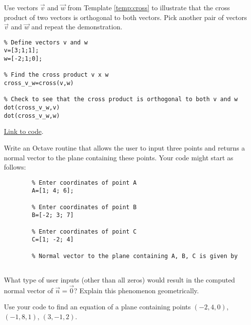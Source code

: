 \documentclass{ximera}
\begin{document}
\begin{problem}\label{prob_oct_vec_1}
    Use vectors $\vec{v}$ and $\vec{w}$ from Template \ref{temp:cross} to illustrate that the cross product of two vectors is orthogonal to both vectors.  Pick another pair of vectors $\vec{v}$ and $\vec{w}$ and repeat the demonstration.
    \begin{hint}
        \begin{verbatim}
% Define vectors v and w
v=[3;1;1];
w=[-2;1;0];

% Find the cross product v x w
cross_v_w=cross(v,w)

% Check to see that the cross product is orthogonal to both v and w
dot(cross_v_w,v)
dot(cross_v_w,w)
\end{verbatim}

\href{https://sagecell.sagemath.org/?z=eJxtjsEKwjAQRO-B_sNeCg1UsHoMOSn-RJES09UEpSvJmvj5phUUxNvMMG9na9jj2U8ICS1TiJDATCPkSiTdb1WnuqOqRNb9alPMejaVqOHgS4kdgg0UI9wDjQ_LBX7O6BIOach6UU1qs3xzO4f2CkwQEQtv-M8RH4ECO7rQZG5z90Tsvn-NxM1noE3yN8nyBT-BRHk=&lang=octave&interacts=eJyLjgUAARUAuQ==}{Link to code}.
    \end{hint}
\end{problem}

\begin{problem}\label{prob_oct_vec_4}
    Write an Octave routine that allows the user to input three points and returns a normal vector to the plane containing these points.  Your code might start as follows:

    \begin{verbatim}
        % Enter coordinates of point A
        A=[1; 4; 6];
        
        % Enter coordinates of point B
        B=[-2; 3; 7]
        
        % Enter coordinates of point C
        C=[1; -2; 4]
        
        % Normal vector to the plane containing A, B, C is given by
        
    \end{verbatim}

    What type of user inputs (other than all zeros) would result in the computed normal vector of $\vec{n}=\vec{0}$?  Explain this phenomenon geometrically.

    Use your code to find an equation of a plane containing points $(-2, 4, 0)$, $(-1, 8, 1)$, $(3, -1, 2)$.
\end{problem}    
\end{document}
